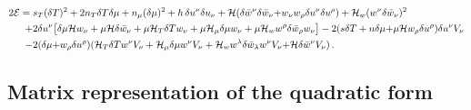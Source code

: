 \documentclass[a4paper, amsfonts, amssymb, amsmath, reprint, showkeys, nofootinbib, twoside,notitlepage,onecolumn]{revtex4-2}
\theoremstyle{definition}
\theoremstyle{theorem}
\theoremstyle{corollary}
\begin{document}
\begin{equation}
\begin{split}
2\mathcal{E}={}& s_T (\delta T)^2 +2 n_T \delta T \delta \mu +n_\mu (\delta \mu)^2 
+ h\,\delta u^\nu \delta u_\nu + \mathcal{H}( \delta \Bar{w}^{\nu}\delta\Bar{w}_\nu {+} w_\nu  w_\rho \delta u^\nu \delta u^\rho) +\mathcal{H}_w  (w^{\nu}\delta \Bar{w}_\nu)^2 \\ 
+{}& 2 \delta u^\nu  \big[\delta \mu \mathcal{H} w_\nu+\mu \mathcal{H} \delta \Bar{w}_\nu + \mu \mathcal{H}_T \delta T  w_\nu + \mu \mathcal{H}_\mu \delta \mu  w_\nu +\mu \mathcal{H}_w  w^\rho \delta \Bar{w}_\rho w_\nu \big] 
- 2(s\delta T +n \delta \mu {+}\mu \mathcal{H}w_\rho \delta u^\rho)\delta u^\nu V_\nu \\ -{}& 2(\delta \mu {+}w_\rho \delta u^\rho)(\mathcal{H}_T \delta T w^{\nu} V_\nu + \mathcal{H}_\mu \delta \mu w^{\nu} V_\nu +\mathcal{H}_w  w^\lambda \delta \Bar{w}_\lambda w^{\nu} V_\nu{+}\mathcal{H}\delta \Bar{w}^{\nu} V_\nu) \, . \\
\end{split}    
\end{equation}

\subsection{Matrix representation of the quadratic form}\label{laquadratazza}
\vspace{-0.2cm}
\end{document}
